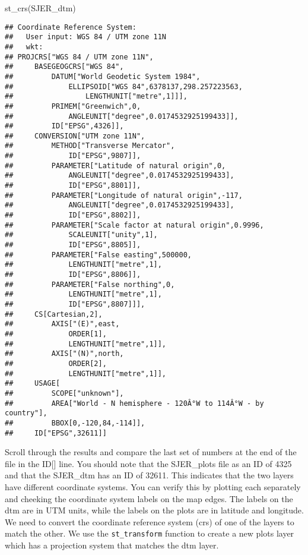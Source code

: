 \documentclass[
]{book}
\newenvironment{Shaded}{\begin{snugshade}}{\end{snugshade}}
\newcommand{\FunctionTok}[1]{\textcolor[rgb]{0.00,0.00,0.00}{#1}}
\newcommand{\NormalTok}[1]{#1}
\begin{document}
\begin{Shaded}
\begin{Highlighting}[]
\FunctionTok{st\_crs}\NormalTok{(SJER\_dtm)}
\end{Highlighting}
\end{Shaded}

\begin{verbatim}
## Coordinate Reference System:
##   User input: WGS 84 / UTM zone 11N 
##   wkt:
## PROJCRS["WGS 84 / UTM zone 11N",
##     BASEGEOGCRS["WGS 84",
##         DATUM["World Geodetic System 1984",
##             ELLIPSOID["WGS 84",6378137,298.257223563,
##                 LENGTHUNIT["metre",1]]],
##         PRIMEM["Greenwich",0,
##             ANGLEUNIT["degree",0.0174532925199433]],
##         ID["EPSG",4326]],
##     CONVERSION["UTM zone 11N",
##         METHOD["Transverse Mercator",
##             ID["EPSG",9807]],
##         PARAMETER["Latitude of natural origin",0,
##             ANGLEUNIT["degree",0.0174532925199433],
##             ID["EPSG",8801]],
##         PARAMETER["Longitude of natural origin",-117,
##             ANGLEUNIT["degree",0.0174532925199433],
##             ID["EPSG",8802]],
##         PARAMETER["Scale factor at natural origin",0.9996,
##             SCALEUNIT["unity",1],
##             ID["EPSG",8805]],
##         PARAMETER["False easting",500000,
##             LENGTHUNIT["metre",1],
##             ID["EPSG",8806]],
##         PARAMETER["False northing",0,
##             LENGTHUNIT["metre",1],
##             ID["EPSG",8807]]],
##     CS[Cartesian,2],
##         AXIS["(E)",east,
##             ORDER[1],
##             LENGTHUNIT["metre",1]],
##         AXIS["(N)",north,
##             ORDER[2],
##             LENGTHUNIT["metre",1]],
##     USAGE[
##         SCOPE["unknown"],
##         AREA["World - N hemisphere - 120Â°W to 114Â°W - by country"],
##         BBOX[0,-120,84,-114]],
##     ID["EPSG",32611]]
\end{verbatim}

Scroll through the results and compare the last set of numbers at the end of the file in the ID{[}{]} line. You should note that the SJER\_plots file as an ID of 4325 and that the SJER\_dtm has an ID of 32611. This indicates that the two layers have different coordinate systems. You can verify this by plotting each separately and cheeking the coordinate system labels on the map edges. The labels on the dtm are in UTM units, while the labels on the plots are in latitude and longitude. We need to convert the coordinate reference system (crs) of one of the layers to match the other. We use the \texttt{st\_transform} function to create a new plots layer which has a projection system that matches the dtm layer.
\end{document}

